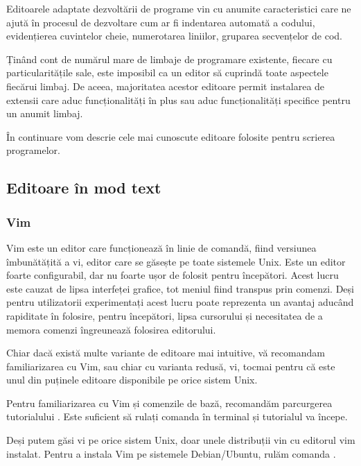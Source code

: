 Editoarele adaptate dezvoltării de programe vin cu anumite caracteristici care
ne ajută în procesul de dezvoltare cum ar fi indentarea automată a codului, evidențierea cuvintelor cheie, numerotarea liniilor, gruparea secvențelor de cod.

Ținând cont de numărul mare de limbaje de programare existente, fiecare cu
particularitățile sale, este imposibil ca un editor să cuprindă toate aspectele
fiecărui limbaj. De aceea, majoritatea acestor editoare permit instalarea de
extensii care aduc funcționalități în plus sau aduc funcționalități specifice
pentru un anumit limbaj.

În continuare vom descrie cele mai cunoscute editoare folosite pentru scrierea
programelor.

\subsection{Editoare în mod text}
\label{sec:appdev:dev-stages:editor}

\subsubsection{Vim}
\label{sec:appdev:dev-stages:editor:vim}

Vim este un editor care funcționează în linie de comandă, fiind versiunea
îmbunătățită a vi, editor care se găsește pe toate sistemele Unix. Este un editor foarte configurabil, dar nu foarte ușor de
folosit pentru începători. Acest lucru este cauzat de lipsa interfeței grafice,
tot meniul fiind transpus prin comenzi. Deși pentru utilizatorii experimentați
acest lucru poate reprezenta un avantaj aducând rapiditate în folosire, pentru
începători, lipsa cursorului și necesitatea de a memora comenzi îngreunează
folosirea editorului.

Chiar dacă există multe variante de editoare mai intuitive, vă recomandam
familiarizarea cu Vim, sau chiar cu varianta redusă, vi, tocmai pentru că este
unul din puținele editoare disponibile pe orice sistem Unix.

Pentru familiarizarea cu Vim și comenzile de bază, recomandăm parcurgerea
tutorialului . Este suficient să rulați comanda  în terminal și
tutorialul va începe.

Deși putem găsi vi pe orice sistem Unix, doar unele distribuții vin cu editorul
vim instalat. Pentru a instala Vim pe sistemele Debian/Ubuntu, rulăm comanda .

